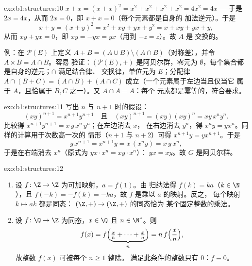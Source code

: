 \begin{solution}{exo:b1:structures:10}
$x + x = (x + x)^2 = x^2 + x^2 + x^2 + x^2 = 4x^2 = 4x$ --- 于是 $2x =
4x$，从而 $2x = 0$，即 $x + x = 0$（每个元素都是自身的
加法逆元）。于是
\[
x + y = (x+y)^2 = x^2 + xy + yx + y^2 = x + xy + yx + y ,
\]
从而 $xy + yx = 0$，即 $xy = -yx = yx$（用到 $-z = z$）。故 $A$ 是
交换的。

例：在 $\mathcal{P}(E)$ 上定义 $A + B = (A \cup B) \setminus (A
\cap B)$（对称差），并令 $A \times B = A \cap B$。容易
验证：$(\mathcal{P}(E), +)$ 是阿贝尔群，零元为
$\emptyset$，每个集合都是自身的逆元；$\cap$ 满足结合律、
交换律，单位元为 $E$；分配律 $A \cap (B + C) = (A
\cap B) + (A \cap C)$ 成立（一个元素属于左边当且仅当它
属于 $A$，且恰属于 $B, C$ 之一）。又 $A \cap A = A$：每个
元素都是幂等的，符合要求。
\end{solution}

\begin{solution}{exo:b1:structures:11}
写出 $n$ 与 $n+1$ 时的假设：
\[
(xy)^{n+1} = x^{n+1} y^{n+1}
\quad\text{且}\quad
(xy)^{n+1} = (xy)(xy)^n = xy\,x^n y^n .
\]
比较得 $x^{n+1} y^{n+1} = x\,y\,x^n\,y^n$；在左边消去 $x$，
在右边消去 $y^n$，得 $x^n y = y x^n$。同样的计算用于次数高一次的
情形（$n+1$ 与 $n+2$）可得 $x^{n+1} y = y x^{n+1}$。于是
\[
y\,x^{n+1} = x^{n+1} y = x\,(x^n y) = x\,y\,x^n ,
\]
于是在右端消去 $x^n$（原式为 $y x \cdot x^n = x y \cdot x^n$）：
$yx = xy$。故 $G$ 是阿贝尔群。
\end{solution}

\begin{solution}{exo:b1:structures:12}
\begin{enumerate}
  \item 设 $f \colon \Z \to \Z$ 为可加映射，$a = f(1)$。由
        归纳法得 $f(k) = ka$（$k \in \N$），且 $f(-k) = -f(k) =
        -ka$，故 $f$ 是乘以 $a$ 的映射。反之，
        每个映射 $k \mapsto ak$ 都是同态：
        $(\Z,+) \to (\Z,+)$ 的同态恰为
        某个固定整数的乘法。
  \item 设 $f \colon \Q \to \Z$ 为同态，$x \in \Q$ 且
        $n \in \N^*$。则
        \[
        f(x) = f\Bigl(\underbrace{\tfrac xn + \dots +
        \tfrac xn}_{n}\Bigr) = n\,f\Bigl(\frac xn\Bigr) ,
        \]
        故整数 $f(x)$ 可被每个 $n \geq 1$ 整除。
        满足此条件的整数只有 $0$：$f \equiv 0$。
\end{enumerate}
\end{solution}

